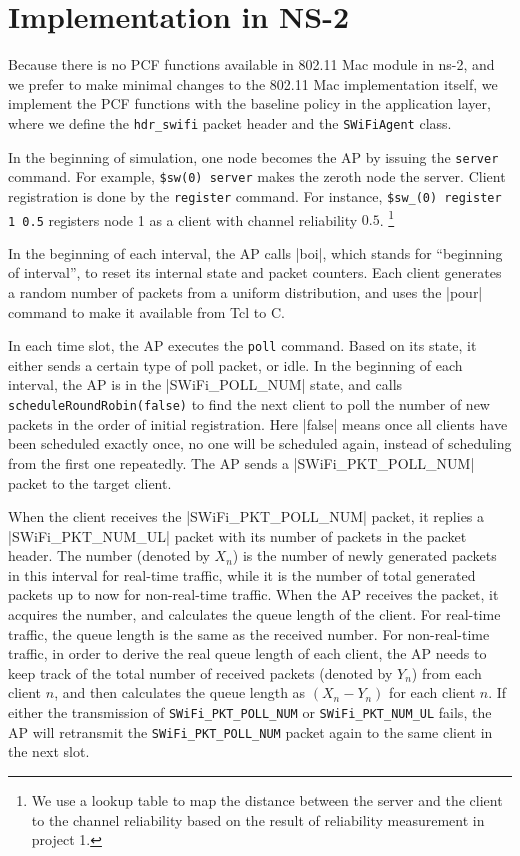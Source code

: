 \documentclass{article}
\begin{document}
\section{Implementation in NS-2}
\label{section: ns2}

Because there is no PCF functions available in 802.11 Mac module in ns-2, and we
prefer to make minimal changes to the 802.11 Mac implementation itself, we
implement the PCF functions with the baseline policy in the application layer,
where we define the \lstinline|hdr_swifi| packet header and the \lstinline|SWiFiAgent| class.

In the beginning of simulation, one node becomes the AP by issuing the
\lstinline|server| command. For example,
\lstinline|$sw(0) server| makes the zeroth node the server.
Client registration is done by the \lstinline|register|
command. For instance, \lstinline|$sw_(0) register 1 0.5|
registers node 1 as a client with channel reliability $0.5$.%
\footnote{We use a lookup table to map the distance between the server and the
client to the channel reliability based on the result of reliability measurement
in project 1.}

\newcommand\CC{C\nolinebreak[4]\hspace{-.05em}\raisebox{0.3ex}{++}}

In the beginning of each interval, the AP calls |boi|, which stands for
``beginning of interval'', to reset its internal state and packet counters.
Each client generates a random number of packets from a uniform distribution,
and uses the |pour| command to make it available from Tcl to \CC.

In each time slot, the AP executes the \lstinline |poll| command.
Based on its state, it either sends a certain type of poll packet, or idle.
In the beginning of each interval, the AP is in the |SWiFi_POLL_NUM| state,
and calls \lstinline |scheduleRoundRobin(false)| to find the next client
to poll the number of new packets
in the order of initial registration. Here |false| means
once all clients have been scheduled exactly once, no one will be scheduled
again, instead of scheduling from the first one repeatedly.
The AP sends a |SWiFi_PKT_POLL_NUM| packet to the target client.

When the client receives the |SWiFi_PKT_POLL_NUM| packet, it replies a
|SWiFi_PKT_NUM_UL| packet with its number of packets in the packet header.
The number (denoted by $X_n$) is the number
of newly generated packets in this interval for real-time traffic, while it is
the number of total generated packets up to now for non-real-time traffic.
When the AP receives the packet, it acquires the number, and calculates the
queue length of the client.
For real-time traffic, the queue length is the same
as the received number. For non-real-time traffic,
in order to derive the real queue length of each client, the AP needs to keep track of the total number of received packets (denoted by $Y_n$) from each client $n$, and then calculates the queue length as $(X_n - Y_n)$ for each client $n$.
If either the transmission of \lstinline|SWiFi_PKT_POLL_NUM| or
\lstinline|SWiFi_PKT_NUM_UL| fails, the AP will retransmit the
\lstinline|SWiFi_PKT_POLL_NUM| packet again to the same client in the next slot. 
\end{document}
